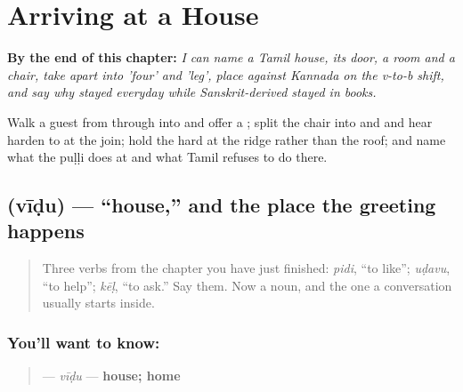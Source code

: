 
\chapter{Arriving at a House}
\label{ch:ta-arriving-at-a-house}

\begin{chapteropening}
\textbf{By the end of this chapter:} \emph{I can name a Tamil house, its door, a room and a chair, take  apart into 'four' and 'leg', place  against Kannada  on the v-to-b shift, and say why  stayed everyday while Sanskrit-derived  stayed in books.}

Walk a guest from  through  into  and offer a ; split the chair into  and  and hear  harden to  at the join; hold the hard  at the ridge rather than the roof; and name what the puḷḷi does at  and what Tamil refuses to do there.
\end{chapteropening}

\section[\texorpdfstring{\ta{வீடு} (vīḍu)}{வீடு (vīḍu)}]{ (vīḍu) — \textquotedblleft{}house,\textquotedblright{} and the place the greeting happens}

\label{lesson:TA-C35-veedu}



\begin{quote}
Three verbs from the chapter you have just finished: \emph{pidi}, \textquotedblleft{}to like\textquotedblright{}; \emph{uḍavu}, \textquotedblleft{}to help\textquotedblright{}; \emph{kēḷ}, \textquotedblleft{}to ask.\textquotedblright{} Say them. Now a noun, and the one a conversation usually starts inside.
\end{quote}

\subsection*{You'll want to know: }
\begin{quote}
\textbf{} — \emph{vīḍu} — \textbf{house; home}
\end{quote}

